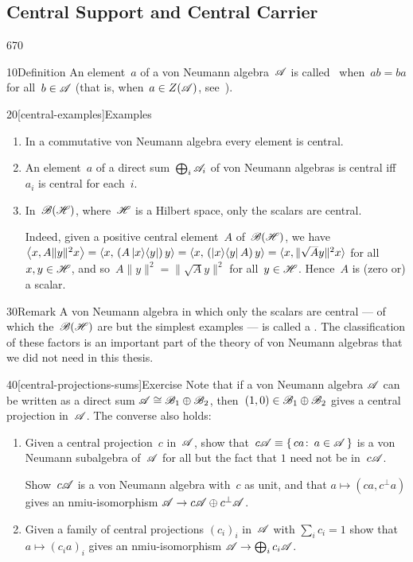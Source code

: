 \subsection{Central Support and Central Carrier}
\begin{parsec}{670}%
\begin{point}{10}{Definition}%
An element~$a$ of a von Neumann algebra~$\mathscr{A}$
is called~%
when~$ab=ba$ for all~$b\in\mathscr{A}$
(that is, when~$a\in Z(\mathscr{A})$, see~).
\end{point}
\begin{point}{20}[central-examples]{Examples}%
\begin{enumerate}
\item
In a commutative von Neumann algebra
every element is central.
\item
An element~$a$ of a direct sum~$\bigoplus_i \mathscr{A}_i$
of von Neumann algebras
is central iff~$a_i$ is central for each~$i$.
\item
In~$\mathscr{B}(\mathscr{H})$,
where~$\mathscr{H}$ is a Hilbert space,
only the scalars are central.

Indeed,
given a positive central element~$A$ 
of~$\mathscr{B}(\mathscr{H})$,
we have $\left<x, A\|y\|^2 x\right>
        = \left<x,\,(A \left|x\right>\!\left<y\right|)\, y\right>
        = \left<x,\,(\left|x\right>\!\left<y\right|A)\, y\right>
= \left<x,\smash{\|\sqrt{A}y\|^2 }x\right>$
for all~$x,y\in\mathscr{H}$,
and so~$A\|y\|^2= \|\sqrt{A}y\|^2$
for all~$y\in\mathscr{H}$.
Hence~$A$ is (zero or) a scalar.

\end{enumerate}
\end{point}
\begin{point}{30}{Remark}%
A von Neumann algebra
in which only the scalars are central
--- of which the~$\mathscr{B}(\mathscr{H})$ are but the simplest examples ---
	is called a .
The classification of these factors
is an important part
of the theory of von Neumann algebras
that we did not need in this thesis.
\end{point}
\begin{point}{40}[central-projections-sums]{Exercise}%
Note that if a von Neumann algebra
$\mathscr{A}$ can be written as
a direct sum $\mathscr{A}\cong \mathscr{B}_1\oplus \mathscr{B}_2$,
then~$(1,0)\in\mathscr{B}_1\oplus\mathscr{B}_2$ gives
a central projection in~$\mathscr{A}$.
The converse also holds:
\begin{enumerate}
\item
Given a central projection~$c$ in~$\mathscr{A}$,
show that~$c\mathscr{A} \equiv \{\,ca\colon\, a\in\mathscr{A}\,\}$ 
is a von Neumann subalgebra of~$\mathscr{A}$
for all but the fact that $1$ need not be in~$c\mathscr{A}$.

Show~$c\mathscr{A}$
is a von Neumann algebra with~$c$ as unit,
and that $a\mapsto (ca,c^\perp a)$
gives an nmiu-isomorphism
$\mathscr{A}\to c\mathscr{A}\oplus c^\perp \mathscr{A}$.
\item
Given a family of central projections $(c_i)_i$ in~$\mathscr{A}$
with $\sum_i c_i=1$
show that $a\mapsto (c_ia)_i$
gives an nmiu-isomorphism $\mathscr{A}\to\bigoplus_i c_i \mathscr{A}$.
\end{enumerate}
\end{point}
\end{parsec}
